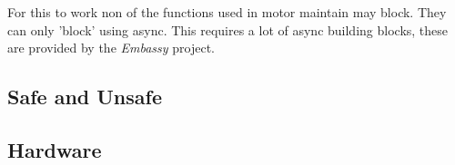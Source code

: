 \documentclass[lang=en, hanging-titles=true]{skrapport}
\begin{document}
For this to work non of the functions used in motor maintain may block. They can only 'block' using async. This requires a lot of async building blocks, these are provided by the \textit{Embassy}\cite{embassy} project.

\subsection{Safe and Unsafe}

\subsection{Hardware}

%
%
%
%
%

\clearpage
\appendix
% 
\printbibliography
\end{document}
